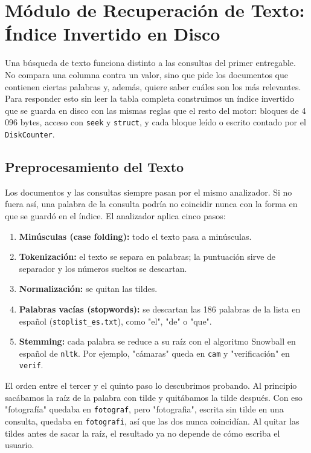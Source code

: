 
\section{Módulo de Recuperación de Texto: Índice Invertido en Disco}

Una búsqueda de texto funciona distinto a las consultas del primer entregable.
No compara una columna contra un valor, sino que pide los documentos que
contienen ciertas palabras y, además, quiere saber cuáles son los más
relevantes. Para responder esto sin leer la tabla completa construimos un índice
invertido que se guarda en disco con las mismas reglas que el resto del motor:
bloques de 4\,096 bytes, acceso con \texttt{seek} y \texttt{struct}, y cada
bloque leído o escrito contado por el \texttt{DiskCounter}.

\subsection{Preprocesamiento del Texto}

Los documentos y las consultas siempre pasan por el mismo analizador. Si no
fuera así, una palabra de la consulta podría no coincidir nunca con la forma en
que se guardó en el índice. El analizador aplica cinco pasos:

\begin{enumerate}
    \item \textbf{Minúsculas (case folding):} todo el texto pasa a minúsculas.
    \item \textbf{Tokenización:} el texto se separa en palabras; la puntuación
    sirve de separador y los números sueltos se descartan.
    \item \textbf{Normalización:} se quitan las tildes.
    \item \textbf{Palabras vacías (stopwords):} se descartan las 186 palabras de
    la lista en español (\texttt{stoplist\_es.txt}), como "el", "de" o "que".
    \item \textbf{Stemming:} cada palabra se reduce a su raíz con el algoritmo
    Snowball en español de \texttt{nltk}. Por ejemplo, "cámaras" queda en
    \texttt{cam} y "verificación" en \texttt{verif}.
\end{enumerate}

El orden entre el tercer y el quinto paso lo descubrimos probando. Al principio
sacábamos la raíz de la palabra con tilde y quitábamos la tilde después. Con eso
"fotografía" quedaba en \texttt{fotograf}, pero "fotografia", escrita sin tilde
en una consulta, quedaba en \texttt{fotografi}, así que las dos nunca
coincidían. Al quitar las tildes antes de sacar la raíz, el resultado ya no
depende de cómo escriba el usuario.

